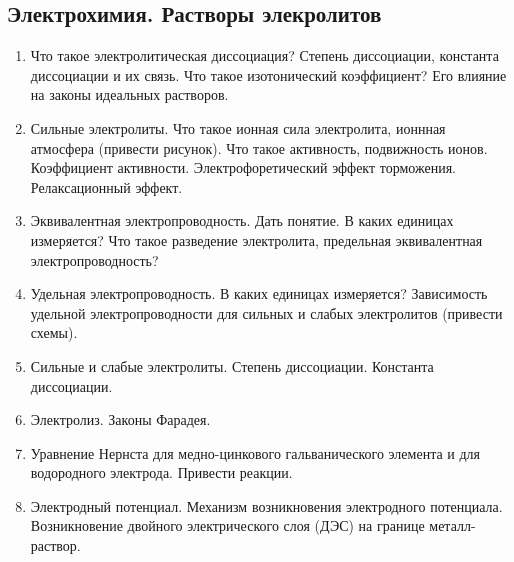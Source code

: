 \subsection{Электрохимия. Растворы элекролитов}
\begin{enumerate}
\item 
Что такое электролитическая диссоциация? Степень диссоциации, константа диссоциации и их связь. Что такое изотонический коэффициент? Его влияние на законы идеальных растворов.

\item
Сильные  электролиты. Что такое ионная сила электролита, ионнная атмосфера (привести рисунок).  Что такое активность, подвижность ионов. Коэффициент активности. Электрофоретический эффект торможения. Релаксационный эффект. 

\item
Эквивалентная электропроводность. Дать понятие. В каких единицах измеряется? Что такое разведение электролита, предельная эквивалентная электропроводность?

\item 
Удельная электропроводность. В каких единицах измеряется? Зависимость удельной электропроводности для сильных и слабых электролитов (привести схемы).
 
\item 
Сильные и слабые электролиты. Степень диссоциации. Константа диссоциации.
 
\item 
Электролиз. Законы Фарадея.

\item
Уравнение Нернста для медно-цинкового гальванического элемента и для водородного электрода. Привести реакции.

\item 
Электродный потенциал. Механизм возникновения электродного потенциала. Возникновение двойного электрического слоя (ДЭС) на границе металл-раствор.
\end{enumerate}

